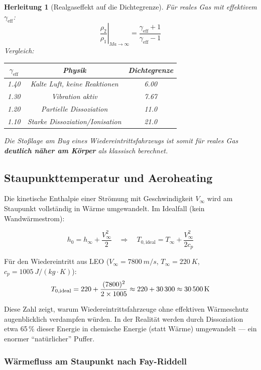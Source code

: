 ﻿\documentclass[12pt,a4paper]{article}
\newtheorem{herleitung}{Herleitung}[section]
\newcommand{\Ma}{M\!a}
\begin{document}
\begin{herleitung}[Realgaseffekt auf die Dichtegrenze]
Für reales Gas mit effektivem $\gamma_{\text{eff}}$:
\[
  \left.\frac{\rho_2}{\rho_1}\right|_{\Ma\to\infty}
    = \frac{\gamma_{\text{eff}}+1}{\gamma_{\text{eff}}-1}
\]
Vergleich:
\begin{center}
\begin{tabular}{ccc}
\toprule
$\gamma_{\text{eff}}$ & Physik & Dichtegrenze\\
\midrule
1.40 & Kalte Luft, keine Reaktionen     & 6.00\\
1.30 & Vibration aktiv                   & 7.67\\
1.20 & Partielle Dissoziation            & 11.0\\
1.10 & Starke Dissoziation/Ionisation    & 21.0\\
\bottomrule
\end{tabular}
\end{center}
Die \emph{Stoßlage am Bug} eines Wiedereintrittsfahrzeugs ist somit für reales Gas
\textbf{deutlich näher am Körper} als klassisch berechnet.
\end{herleitung}

\subsection{Staupunkttemperatur und Aeroheating}

Die kinetische Enthalpie einer Strömung mit Geschwindigkeit $V_\infty$ wird am
Staupunkt vollständig in Wärme umgewandelt. Im Idealfall (kein Wandwärmestrom):

\[
  h_0 = h_\infty + \frac{V_\infty^2}{2}
  \quad\Rightarrow\quad
  T_{0,\text{ideal}} = T_\infty + \frac{V_\infty^2}{2c_p}
\]

Für den Wiedereintritt aus LEO ($V_\infty = \SI{7800}{m/s}$, $T_\infty = \SI{220}{K}$,
$c_p = \SI{1005}{J/(kg\cdot K)}$):
\[
  T_{0,\text{ideal}} = 220 + \frac{(7800)^2}{2\times1005}
    \approx 220 + 30\,300 \approx \SI{30\,500}{K}
\]

Diese Zahl zeigt, warum Wiedereintrittsfahrzeuge ohne effektiven Wärmeschutz
augenblicklich verdampfen würden. In der Realität werden durch Dissoziation etwa
65\,\% dieser Energie in chemische Energie (statt Wärme) umgewandelt --- ein
enormer ``natürlicher'' Puffer.

\subsubsection{Wärmefluss am Staupunkt nach Fay-Riddell}
\end{document}
